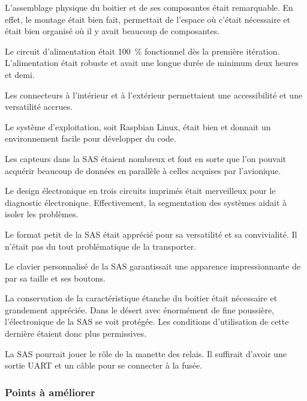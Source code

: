 L’assemblage physique du boitier et de ses composantes était remarquable.
En effet, le montage était bien fait, permettait de l’espace où c’était
nécessaire et était bien organisé où il y avait beaucoup de composantes.
\par
Le circuit d’alimentation était 100~\% fonctionnel dès la première itération.
L’alimentation était robuste et avait une longue durée de minimum deux heures
et demi.
\par
Les connecteurs à l’intérieur et à l’extérieur permettaient une accessibilité
et une versatilité accrues.
\par
Le système d’exploitation, soit Raspbian Linux, était bien et donnait un
environnement facile pour développer du code.
\par
Les capteurs dans la SAS étaient nombreux et font en sorte que l’on pouvait
acquérir beaucoup de données en parallèle à celles acquises par l’avionique.
\par
Le design électronique en trois circuits imprimés était merveilleux pour le
diagnostic électronique. Effectivement, la segmentation des systèmes aidait à
isoler les problèmes.
\par
Le format petit de la SAS était apprécié pour sa versatilité et sa
convivialité. Il n’était pas du tout problématique de la transporter.
\par
Le clavier personnalisé de la SAS garantissait une apparence impressionnante de
par sa taille et ses boutons.
\par
La conservation de la caractéristique étanche du boitier était nécessaire et
grandement appréciée. Dans le désert avec énormément de fine poussière,
l’électronique de la SAS se voit protégée. Les conditions d’utilisation de
cette dernière étaient donc plus permissives.
\par
La SAS pourrait jouer le rôle de la manette des relais. Il suffirait d'avoir une
sortie UART et un câble pour se connecter à la fusée.

\subsubsection{Points à améliorer}

